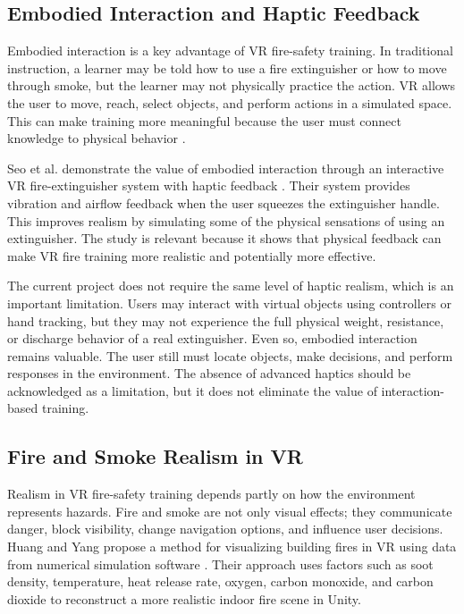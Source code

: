 \documentclass[manuscript, review]{acmart}
\begin{document}
{\subsection{Embodied Interaction and Haptic Feedback}

Embodied interaction is a key advantage of VR fire-safety training. In traditional instruction, a learner may be told how to use a fire extinguisher or how to move through smoke, but the learner may not physically practice the action. VR allows the user to move, reach, select objects, and perform actions in a simulated space. This can make training more meaningful because the user must connect knowledge to physical behavior \cite{kolb1984experiential,dede2009immersive}.

Seo et al. demonstrate the value of embodied interaction through an interactive VR fire-extinguisher system with haptic feedback \cite{seo2019interactive}. Their system provides vibration and airflow feedback when the user squeezes the extinguisher handle. This improves realism by simulating some of the physical sensations of using an extinguisher. The study is relevant because it shows that physical feedback can make VR fire training more realistic and potentially more effective.

The current project does not require the same level of haptic realism, which is an important limitation. Users may interact with virtual objects using controllers or hand tracking, but they may not experience the full physical weight, resistance, or discharge behavior of a real extinguisher. Even so, embodied interaction remains valuable. The user still must locate objects, make decisions, and perform responses in the environment. The absence of advanced haptics should be acknowledged as a limitation, but it does not eliminate the value of interaction-based training.

\subsection{Fire and Smoke Realism in VR}

Realism in VR fire-safety training depends partly on how the environment represents hazards. Fire and smoke are not only visual effects; they communicate danger, block visibility, change navigation options, and influence user decisions. Huang and Yang propose a method for visualizing building fires in VR using data from numerical simulation software \cite{huang2025building}. Their approach uses factors such as soot density, temperature, heat release rate, oxygen, carbon monoxide, and carbon dioxide to reconstruct a more realistic indoor fire scene in Unity.

}
\end{document}

